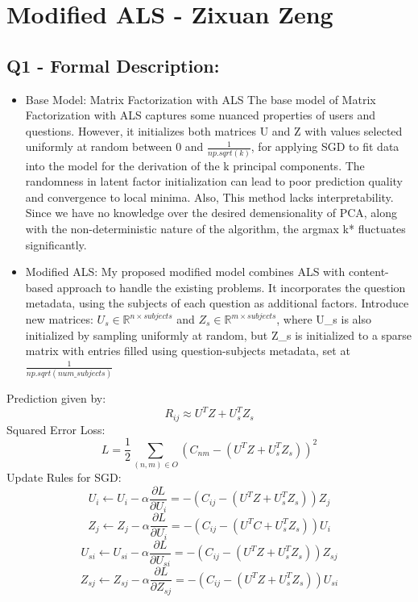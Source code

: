 \documentclass{article}
\begin{document}
\section*{Modified ALS - Zixuan Zeng}
\subsection*{Q1 - Formal Description:}
\begin{itemize}
    \item Base Model: Matrix Factorization with ALS\newline
    The base model of Matrix Factorization with ALS captures some nuanced properties of users and questions. \newline
    However, it initializes both matrices U and Z with values selected uniformly at random between 0 and $\frac{1}{np.sqrt(k)}$, for applying SGD to fit data into the model for the derivation of the k principal components.\newline
    The randomness in latent factor initialization can lead to poor prediction quality and convergence to local minima.\newline
    Also, This method lacks interpretability. Since we have no knowledge over the desired demensionality of PCA, along with the non-deterministic nature of the algorithm, the argmax k* fluctuates significantly. 
    \item Modified ALS:\newline
    My proposed modified model combines ALS with content-based approach to handle the existing problems.\newline
    It incorporates the question metadata, using the subjects of each question as additional factors.\newline
    Introduce new matrices: $U_s \in \mathbb{R}^{n\times subjects} $ and $Z_s \in \mathbb{R}^{m\times subjects} $, where U\_s is also initialized by sampling uniformly at random, but Z\_s is initialized to a sparse matrix with entries filled using question-subjects metadata, set at $\frac{1}{np.sqrt(num\_subjects)}$\newline

\end{itemize}
Prediction given by:
\[R_{ij} \approx U^T Z + U_s^T Z_s\]\newline
Squared Error Loss: 
\[L = \frac{1}{2} \sum_{(n,m) \in O} (C_{nm} - (U^T Z + U_s^T Z_s))^2\]
Update Rules for SGD:
\[U_i \leftarrow U_i - \alpha \frac{\partial L}{\partial U_i} = -(C_{ij} - (U^T Z + U_s^T Z_s)) Z_j\]
\[Z_j \leftarrow Z_j - \alpha \frac{\partial L}{\partial U_i} = -(C_{ij} - (U^T C + U_s^T Z_s)) U_i\]
\[U_{si} \leftarrow U_{si} - \alpha \frac{\partial L}{\partial U_{si}} = -(C_{ij} - (U^T Z + U_s^T Z_s)) Z_{sj}\]
\[Z_{sj} \leftarrow Z_{sj} - \alpha \frac{\partial L}{\partial Z_{sj}} = -(C_{ij} - (U^T Z + U_s^T Z_s)) U_{si}\]
\newpage
\end{document}
